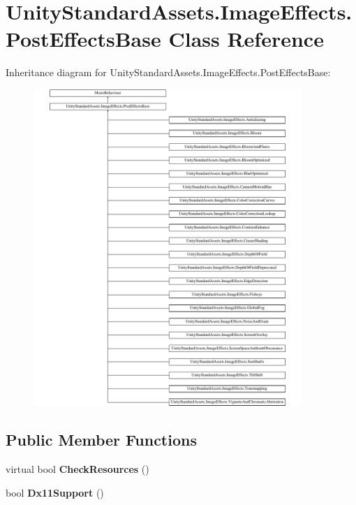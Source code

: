\hypertarget{class_unity_standard_assets_1_1_image_effects_1_1_post_effects_base}{}\section{Unity\+Standard\+Assets.\+Image\+Effects.\+Post\+Effects\+Base Class Reference}
\label{class_unity_standard_assets_1_1_image_effects_1_1_post_effects_base}
Inheritance diagram for Unity\+Standard\+Assets.\+Image\+Effects.\+Post\+Effects\+Base\+:\begin{figure}[H]
\begin{center}
\leavevmode
\includegraphics[height=12.000000cm]{class_unity_standard_assets_1_1_image_effects_1_1_post_effects_base}
\end{center}
\end{figure}
\subsection*{Public Member Functions}
\begin{DoxyCompactItemize}
\item 
virtual bool {\bfseries Check\+Resources} ()\hypertarget{class_unity_standard_assets_1_1_image_effects_1_1_post_effects_base_a8866612b25b7158b932efd3b832188f8}{}\label{class_unity_standard_assets_1_1_image_effects_1_1_post_effects_base_a8866612b25b7158b932efd3b832188f8}

\item 
bool {\bfseries Dx11\+Support} ()\hypertarget{class_unity_standard_assets_1_1_image_effects_1_1_post_effects_base_a0843db7636c8937b5496045ca5f99b2a}{}\label{class_unity_standard_assets_1_1_image_effects_1_1_post_effects_base_a0843db7636c8937b5496045ca5f99b2a}

\end{DoxyCompactItemize}
